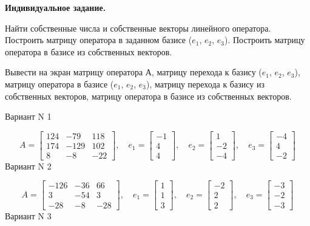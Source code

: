 \documentclass[11pt]{report}
\begin{document}
\pagestyle{empty}

{\bf Индивидуальное задание.}


Найти собственные числа и собственные векторы линейного оператора.
Построить матрицу оператора в заданном базисе ($e_1$, $e_2$, $e_3$).
Построить матрицу оператора в базисе из собственных векторов.

Вывести на экран матрицу оператора А, матрицу перехода к базису ($e_1$, $e_2$, $e_3$),
матрицу оператора в базисе ($e_1$, $e_2$, $e_3$), матрицу перехода к базису из собственных векторов,
матрицу оператора в базисе из собственных векторов.

Вариант N 1

$$A = \left[\begin{matrix}124 & -79 & 118\\174 & -129 & 102\\8 & -8 & -22\end{matrix}\right],\quad e_1 = \left[\begin{matrix}-1\\4\\4\end{matrix}\right],\quad e_2 = \left[\begin{matrix}1\\-2\\-4\end{matrix}\right],\quad e_3 = \left[\begin{matrix}-4\\4\\-2\end{matrix}\right]$$Вариант N 2

$$A = \left[\begin{matrix}-126 & -36 & 66\\3 & -54 & 3\\-28 & -8 & -28\end{matrix}\right],\quad e_1 = \left[\begin{matrix}1\\1\\3\end{matrix}\right],\quad e_2 = \left[\begin{matrix}-2\\2\\2\end{matrix}\right],\quad e_3 = \left[\begin{matrix}-3\\-2\\-3\end{matrix}\right]$$Вариант N 3
\end{document}
